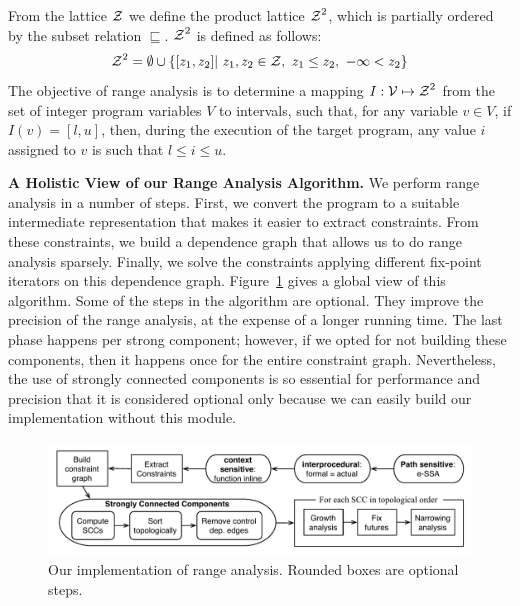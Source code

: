 \documentclass{paper}
\newcommand{\varset}[1]{\mbox{$\cal{#1}$}}
\begin{document}
From the lattice $\varset{Z}$ we define the product lattice
$\varset{Z}^2$, which is partially ordered by the subset relation
$\sqsubseteq$.
$\varset{Z}^2$ is defined as follows:
%
\begin{equation*}
\varset{Z}^2 = \emptyset \cup \{[z_1, z_2] | \ z_1,z_2 \in \varset{Z},
\ z_1 \leq z_2, \  -\infty < z_2 \}
\end{equation*}
%
The objective of range analysis is to determine a mapping
$I: \varset{V} \mapsto \varset{Z}^2$ from the set of integer program variables
$V$ to intervals, such that, for any variable $v \in V$, if
$I(v) = [l, u]$, then, during the execution of the target program, any
value $i$ assigned to $v$ is such that $l \leq i \leq u$.

\noindent
\textbf{A Holistic View of our Range Analysis Algorithm.}
We perform range analysis in a number of steps.
First, we convert the program to a suitable intermediate representation that
makes it easier to extract constraints.
From these constraints, we build a dependence graph that allows us to do
range analysis sparsely.
Finally, we solve the constraints applying different fix-point iterators on
this dependence graph.
Figure~\ref{fig:algorithm} gives a global view of this algorithm.
Some of the steps in the algorithm are optional.
They improve the precision of the range analysis, at the expense of a longer
running time.
The last phase happens per strong component; however, if we opted for not building 
these components, then it happens once for the entire constraint graph.
Nevertheless, the use of strongly connected components
is so essential for performance and precision that it is considered optional only because we
can easily build our implementation without this module.


\begin{figure}[h]
\begin{center}
\includegraphics[width=\textwidth]{images/algorithm}
\end{center}
\caption{\label{fig:algorithm}
Our implementation of range analysis. Rounded boxes are optional steps.}
\end{figure}
\end{document}
